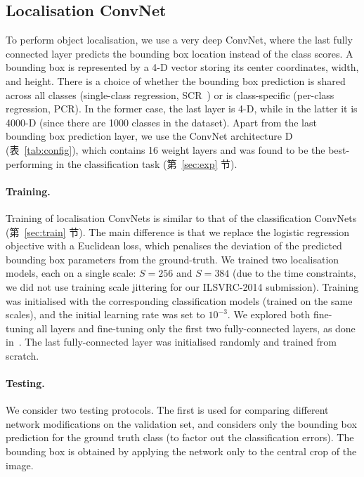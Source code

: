\documentclass{article} %
\newcommand{\tblref}[1]{表~\ref{#1}}
\newcommand{\sref}[1]{第~\ref{#1} 节}
\begin{document}
\subsection{Localisation ConvNet}
\label{sec:loc_method}
To perform object localisation, we use a very deep ConvNet, where the last fully connected layer predicts the bounding box location instead of the class scores.
A bounding box is represented by a 4-D vector storing its center coordinates, width, and height. There is a choice of whether the bounding box prediction is shared across all classes
(single-class regression, SCR~\citep{Sermanet14}) or is class-specific (per-class regression, PCR). In the former case, the last layer is 4-D, while in the latter it is 4000-D (since
there are 1000 classes in the dataset).
Apart from the last bounding box prediction layer, we use the ConvNet architecture D (\tblref{tab:config}), which contains 16 weight layers and was found to be the best-performing in the classification task
(\sref{sec:exp}). 

\paragraph{Training.} 
Training of localisation ConvNets is similar to that of the classification ConvNets (\sref{sec:train}).
The main difference is that we replace the logistic regression objective with a Euclidean loss, which penalises the deviation of the predicted bounding box parameters from the ground-truth.
We trained two localisation models, each on a single scale: $S=256$ and $S=384$ (due to the time constraints, we did not use training scale jittering for our ILSVRC-2014 submission).
Training was initialised with the corresponding classification models (trained on the same scales), and the initial learning rate was set to $10^{-3}$.
We explored both fine-tuning all layers and fine-tuning only the first two fully-connected layers, as done in~\citep{Sermanet14}. The last fully-connected layer was
initialised randomly and trained from scratch.

\paragraph{Testing.} 
We consider two testing protocols. 
The first is used for comparing different network modifications on the validation set, and considers only the bounding box prediction for the ground truth class (to factor out the classification errors).
The bounding box is obtained by applying the network only to the central crop of the image.
\end{document}
